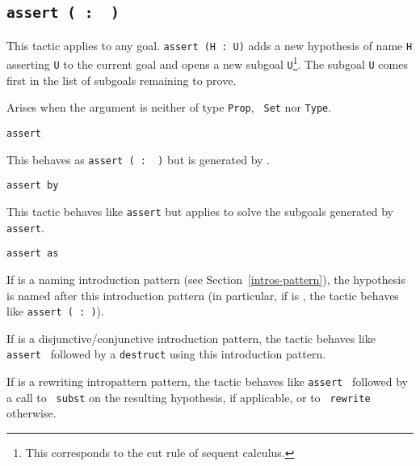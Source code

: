 \begin{coq_example*}
\subsection{\tt assert ( {\ident} :\ {\form} )}

This tactic applies to any goal. {\tt assert (H : U)} adds a new
hypothesis of name \texttt{H} asserting \texttt{U} to the current goal
and opens a new subgoal \texttt{U}\footnote{This corresponds to the
  cut rule of sequent calculus.}. The subgoal {\texttt U} comes first
in the list of subgoals remaining to prove.

\begin{ErrMsgs}
\item {}

  Arises when the argument {\form} is neither of type {\tt Prop}, {\tt
    Set} nor {\tt Type}.

\end{ErrMsgs}

\begin{Variants}

\item{\tt assert {\form}}

  This behaves as {\tt assert ( {\ident} :\ {\form} )} but
  {\ident} is generated by {\Coq}.

\item \texttt{assert {\form} by {\tac}}

  This tactic behaves like \texttt{assert} but applies {\tac}
  to solve the subgoals generated by \texttt{assert}.

  \ErrMsg {}

\item \texttt{assert {\form} as {\intropattern}}

  If {\intropattern} is a naming introduction pattern (see
  Section~\ref{intros-pattern}), the hypothesis is named after this
  introduction pattern (in particular, if {\intropattern} is {\ident},
  the tactic behaves like \texttt{assert ({\ident} :\ {\form})}).

  If {\intropattern} is a disjunctive/conjunctive 
  introduction pattern, the tactic behaves like \texttt{assert
    {\form}} followed by a {\tt destruct} using this introduction pattern.

  If {\intropattern} is a rewriting intropattern pattern, the tactic
  behaves like \texttt{assert {\form}} followed by a call to {\tt
    subst} on the resulting hypothesis, if applicable, or to {\tt
    rewrite} otherwise.


\end{Variants}
\end{coq_example*}
